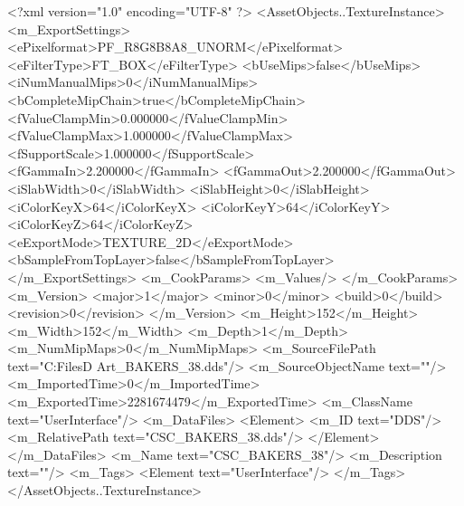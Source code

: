 <?xml version="1.0" encoding="UTF-8" ?>
<AssetObjects..TextureInstance>
	<m_ExportSettings>
		<ePixelformat>PF_R8G8B8A8_UNORM</ePixelformat>
		<eFilterType>FT_BOX</eFilterType>
		<bUseMips>false</bUseMips>
		<iNumManualMips>0</iNumManualMips>
		<bCompleteMipChain>true</bCompleteMipChain>
		<fValueClampMin>0.000000</fValueClampMin>
		<fValueClampMax>1.000000</fValueClampMax>
		<fSupportScale>1.000000</fSupportScale>
		<fGammaIn>2.200000</fGammaIn>
		<fGammaOut>2.200000</fGammaOut>
		<iSlabWidth>0</iSlabWidth>
		<iSlabHeight>0</iSlabHeight>
		<iColorKeyX>64</iColorKeyX>
		<iColorKeyY>64</iColorKeyY>
		<iColorKeyZ>64</iColorKeyZ>
		<eExportMode>TEXTURE_2D</eExportMode>
		<bSampleFromTopLayer>false</bSampleFromTopLayer>
	</m_ExportSettings>
	<m_CookParams>
		<m_Values/>
	</m_CookParams>
	<m_Version>
		<major>1</major>
		<minor>0</minor>
		<build>0</build>
		<revision>0</revision>
	</m_Version>
	<m_Height>152</m_Height>
	<m_Width>152</m_Width>
	<m_Depth>1</m_Depth>
	<m_NumMipMaps>0</m_NumMipMaps>
	<m_SourceFilePath text="C:\Users\Shadow\Desktop\Working Files\2D Art\Quarters\Bakers\CSC_BAKERS_38.dds"/>
	<m_SourceObjectName text=""/>
	<m_ImportedTime>0</m_ImportedTime>
	<m_ExportedTime>2281674479</m_ExportedTime>
	<m_ClassName text="UserInterface"/>
	<m_DataFiles>
		<Element>
			<m_ID text="DDS"/>
			<m_RelativePath text="CSC_BAKERS_38.dds"/>
		</Element>
	</m_DataFiles>
	<m_Name text="CSC_BAKERS_38"/>
	<m_Description text=""/>
	<m_Tags>
		<Element text="UserInterface"/>
	</m_Tags>
</AssetObjects..TextureInstance>

